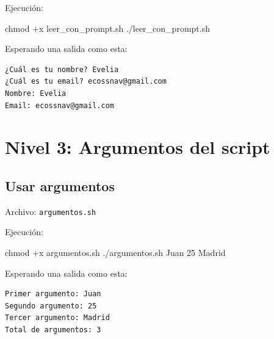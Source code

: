 \documentclass[
  spanish,
  12pt,
  letterpaper,
  DIV=11,
  numbers=noendperiod]{scrreprt}
\newenvironment{Shaded}{\begin{snugshade}}{\end{snugshade}}
\newcommand{\BuiltInTok}[1]{\textcolor[rgb]{0.00,0.23,0.31}{#1}}
\newcommand{\CommentTok}[1]{\textcolor[rgb]{0.37,0.37,0.37}{#1}}
\newcommand{\ExtensionTok}[1]{\textcolor[rgb]{0.00,0.23,0.31}{#1}}
\newcommand{\FunctionTok}[1]{\textcolor[rgb]{0.28,0.35,0.67}{#1}}
\newcommand{\NormalTok}[1]{\textcolor[rgb]{0.00,0.23,0.31}{#1}}
\newcommand{\StringTok}[1]{\textcolor[rgb]{0.13,0.47,0.30}{#1}}
\newcommand{\VariableTok}[1]{\textcolor[rgb]{0.07,0.07,0.07}{#1}}
\begin{document}
Ejecución:

\begin{Shaded}
\begin{Highlighting}[]
\FunctionTok{chmod}\NormalTok{ +x leer\_con\_prompt.sh}
\ExtensionTok{./leer\_con\_prompt.sh}
\end{Highlighting}
\end{Shaded}

Esperando una salida como esta:

\begin{verbatim}
¿Cuál es tu nombre? Evelia
¿Cuál es tu email? ecossnav@gmail.com
Nombre: Evelia
Email: ecossnav@gmail.com
\end{verbatim}

\section{\texorpdfstring{\textbf{Nivel 3: Argumentos del
script}}{Nivel 3: Argumentos del script}}\label{nivel-3-argumentos-del-script}

\subsection{Usar argumentos}\label{usar-argumentos}

Archivo: \texttt{argumentos.sh}

\begin{Shaded}
\end{Shaded}

Ejecución:

\begin{Shaded}
\begin{Highlighting}[]
\FunctionTok{chmod}\NormalTok{ +x argumentos.sh}
\ExtensionTok{./argumentos.sh}\NormalTok{ Juan 25 Madrid}
\end{Highlighting}
\end{Shaded}

Esperando una salida como esta:

\begin{verbatim}
Primer argumento: Juan
Segundo argumento: 25
Tercer argumento: Madrid
Total de argumentos: 3
\end{verbatim}
\end{document}
